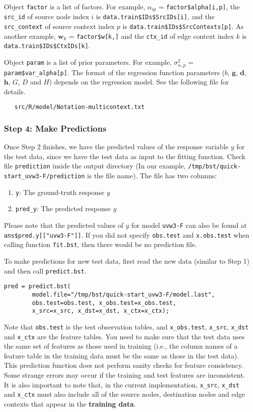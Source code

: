 Object {\tt factor} is a list of factors.  For example, $\alpha_{ip}$ = {\tt factor\$alpha[i,p]}, the {\tt src\_id} of source node index $i$ is {\tt data.train\$IDs\$SrcIDs[i]}, and the {\tt src\_context} of source context index $p$ is {\tt data.train\$IDs\$SrcContexts[p]}.  As another example, $\bm{w}_k$ = 
{\tt factor\$w[k,]} and the {\tt ctx\_id} of edge context index $k$ is {\tt data.train\$IDs\$CtxIDs[k]}.

Object {\tt param} is a list of prior parameters.  For example, $\sigma^2_{\alpha,p}$ = {\tt param\$var\_alpha[p]}.  The format of the regression function parameters ($b$, $\bm{g}$, $\bm{d}$, $\bm{h}$, $G$, $D$ and $H$) depends on the regression model.  See the following file for details.
{\small\begin{verbatim}
   src/R/model/Notation-multicontext.txt
\end{verbatim}}

\subsubsection{Step 4: Make Predictions}

Once Step 2 finishes, we have the predicted values of the response variable $y$ for the test data, since we have the test data as input to the fitting function. Check file {\tt prediction} inside the output directory (In our example, {\tt /tmp/bst/quick-start\_uvw3-F/prediction} is the file name). The file has two columns: 
\begin{enumerate}
\item {\tt y}: The ground-truth response $y$
\item {\tt pred\_y}: The predicted response $y$
\end{enumerate}
Please note that the predicted values of $y$ for model {\tt uvw3-F} can also be found at {\tt ans\$pred.y[["uvw3-F"]]}.
If you did not specify {\tt obs.test} and {\tt x.obs.test} when calling function {\tt fit.bst}, then there would be no prediction file.

To make predictions for new test data, first read the new data (similar to Step 1) and then call {\tt predict.bst}.
{\small\begin{verbatim}
pred = predict.bst(
        model.file="/tmp/bst/quick-start_uvw3-F/model.last",
        obs.test=obs.test, x_obs.test=x_obs.test,
        x_src=x_src, x_dst=x_dst, x_ctx=x_ctx);
\end{verbatim}}
\noindent Note that {\tt obs.test} is the test observation tables, and {\tt x\_obs.test}, {\tt x\_src}, {\tt x\_dst} and {\tt x\_ctx} are the feature tables.  You need to make sure that the test data uses the same set of features as those used in training (i.e., the column names of a feature table in the training data must be the same as those in the test data).  This prediction function does not perform sanity checks for feature consistency.  Some strange errors may occur if the training and test features are inconsistent.  It is also important to note that, in the current implementation, {\tt x\_src}, {\tt x\_dst} and {\tt x\_ctx} must also include all of the source nodes, destination nodes and edge contexts that appear in the {\bf training data}.

